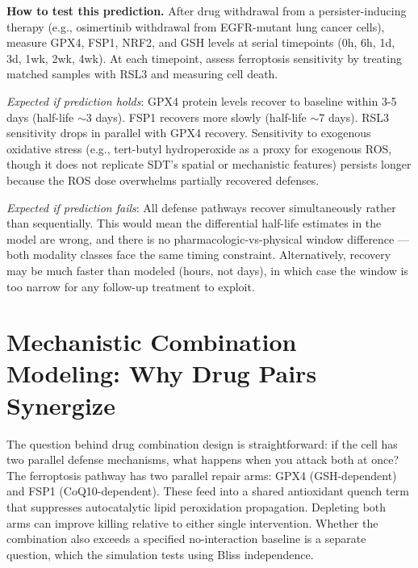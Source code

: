 \documentclass[11pt,twoside,openright]{report}
\begin{document}
\textbf{How to test this prediction.} After drug withdrawal from a persister-inducing therapy (e.g., osimertinib withdrawal from EGFR-mutant lung cancer cells), measure GPX4, FSP1, NRF2, and GSH levels at serial timepoints (0h, 6h, 1d, 3d, 1wk, 2wk, 4wk). At each timepoint, assess ferroptosis sensitivity by treating matched samples with RSL3 and measuring cell death.

\textit{Expected if prediction holds}: GPX4 protein levels recover to baseline within 3-5 days (half-life $\sim$3 days). FSP1 recovers more slowly (half-life $\sim$7 days). RSL3 sensitivity drops in parallel with GPX4 recovery. Sensitivity to exogenous oxidative stress (e.g., tert-butyl hydroperoxide as a proxy for exogenous ROS, though it does not replicate SDT's spatial or mechanistic features) persists longer because the ROS dose overwhelms partially recovered defenses.

\textit{Expected if prediction fails}: All defense pathways recover simultaneously rather than sequentially. This would mean the differential half-life estimates in the model are wrong, and there is no pharmacologic-vs-physical window difference --- both modality classes face the same timing constraint. Alternatively, recovery may be much faster than modeled (hours, not days), in which case the window is too narrow for any follow-up treatment to exploit.

\section{Mechanistic Combination Modeling: Why Drug Pairs Synergize}

The question behind drug combination design is straightforward: if the cell has two parallel defense mechanisms, what happens when you attack both at once? The ferroptosis pathway has two parallel repair arms: GPX4 (GSH-dependent) and FSP1 (CoQ10-dependent). These feed into a shared antioxidant quench term that suppresses autocatalytic lipid peroxidation propagation. Depleting both arms can improve killing relative to either single intervention. Whether the combination also exceeds a specified no-interaction baseline is a separate question, which the simulation tests using Bliss independence.
\end{document}
